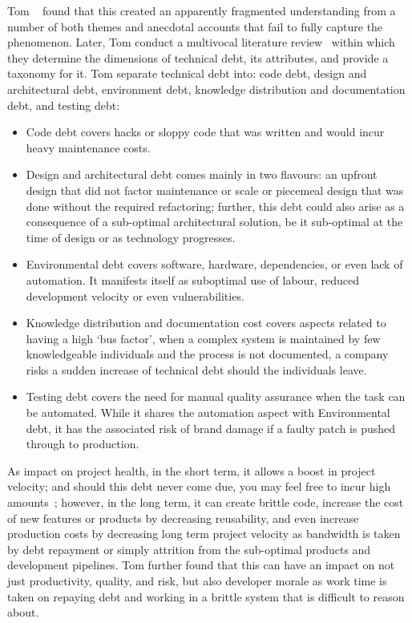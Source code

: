 Tom \etal~\cite{tom2012consolidated} found that this created an apparently
fragmented understanding from a number of both themes and anecdotal accounts
that fail to fully capture the phenomenon. Later, Tom \etal conduct a multivocal
literature review~\cite{tom2013exploration} within which they determine the
dimensions of technical debt, its attributes, and provide a taxonomy for it. Tom
\etal separate technical debt into: code debt, design and architectural debt,
environment debt, knowledge distribution and documentation debt, and testing
debt:
\begin{itemize}
    \item Code debt covers hacks or sloppy code that was written and would incur
    heavy maintenance costs.
    \item Design and architectural debt comes mainly in two flavours: an upfront
    design that did not factor maintenance or scale or piecemeal design that was
    done without the required refactoring; further, this debt could also arise
    as a consequence of a sub-optimal architectural solution, be it sub-optimal
    at the time of design or as technology progresses.
    \item Environmental debt covers software, hardware, dependencies, or even
    lack of automation. It manifests itself as suboptimal use of labour, reduced
    development velocity or even vulnerabilities.
    \item Knowledge distribution and documentation cost covers aspects related
    to having a high `bus factor', when a complex system is maintained by few
    knowledgeable individuals and the process is not documented, a company risks
    a sudden increase of technical debt should the individuals leave.
    \item Testing debt covers the need for manual quality assurance when the
    task can be automated. While it shares the automation aspect with
    Environmental debt, it has the associated risk of brand damage if a faulty
    patch is pushed through to production.
\end{itemize}  

As impact on project health, in the short term, it allows a boost in project
velocity; and should this debt never come due, you may feel free to incur high
amounts~\cite{tom2013exploration}; however, in the long term, it can create
brittle code, increase the cost of new features or products by decreasing
reusability, and even increase production costs by decreasing long term project
velocity as bandwidth is taken by debt repayment or simply attrition from the
sub-optimal products and development pipelines. Tom \etal further found that
this can have an impact on not just productivity, quality, and risk, but also
developer morale as work time is taken on repaying debt and working in a brittle
system that is difficult to reason about.

